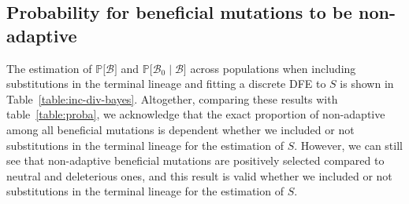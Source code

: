 \documentclass{article}
\newcommand{\proba}{\mathbb{P}}
\newcommand{\SphyBen}{\mathcal{B}_0}
\newcommand{\given}{\mid}
\newcommand{\Spop}{S}
\newcommand{\SpopBen}{\mathcal{B}}
\begin{document}
    \newpage

    \subsection{Probability for beneficial mutations to be non-adaptive}
    The estimation of $\proba{[} \SpopBen {]}$ and $\proba{[}\SphyBen\given \SpopBen {]}$ across populations when including substitutions in the terminal lineage and fitting a discrete DFE to $\Spop$ is shown in Table~\ref{table:inc-div-bayes}.
    Altogether, comparing these results with table~\ref{table:proba}, we acknowledge that the exact proportion of non-adaptive among all beneficial mutations is dependent whether we included or not substitutions in the terminal lineage for the estimation of $\Spop$.
    However, we can still see that non-adaptive beneficial mutations are positively selected compared to neutral and deleterious ones, and this result is valid whether we included or not substitutions in the terminal lineage for the estimation of $\Spop$.
\end{document}
